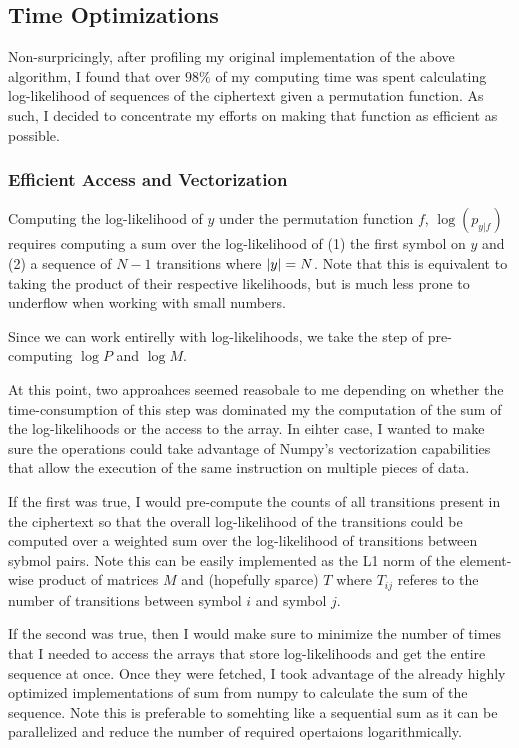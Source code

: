 \documentclass{siamart190516}
\begin{document}
\subsection{Time Optimizations}
Non-surpricingly, after profiling my original implementation of the above algorithm, I found that over $98\%$ of my computing time was spent calculating log-likelihood of sequences of the ciphertext given a permutation function. As such, I decided to concentrate my efforts on making that function as efficient as possible.

\subsubsection{Efficient Access and Vectorization}
Computing the log-likelihood of $y$ under the permutation function $f$, $\log(p_{y | f})$ requires computing a sum over the log-likelihood of (1) the first symbol on $y$ and (2) a sequence of $N - 1$ transitions where $\left| y \right| = N$. Note that this is equivalent to taking the product of their respective likelihoods, but is much less prone to underflow when working with small numbers.

Since we can work entirelly with log-likelihoods, we take the step of pre-computing $\log P$ and $\log M$.

At this point, two approahces seemed reasobale to me depending on whether the time-consumption of this step was dominated my the computation of the sum of the log-likelihoods or the access to the array. In eihter case, I wanted to make sure the operations could take advantage of Numpy's vectorization capabilities that allow the execution of the same instruction on multiple pieces of data.

If the first was true, I would pre-compute the counts of all transitions present in the ciphertext so that the overall log-likelihood of the transitions could be computed over a weighted sum over the log-likelihood of transitions between sybmol pairs. Note this can be easily implemented as the L1 norm of the element-wise product of matrices $M$ and (hopefully sparce) $T$ where $T_{ij}$ referes to the number of transitions between symbol $i$ and symbol $j$.

If the second was true, then I would make sure to minimize the number of times that I needed to access the arrays that store log-likelihoods and get the entire sequence at once. Once they were fetched, I took advantage of the already highly optimized implementations of sum from numpy to calculate the sum of the sequence. Note this is preferable to somehting like a sequential sum as it can be parallelized and reduce the number of required opertaions logarithmically.
\end{document}
